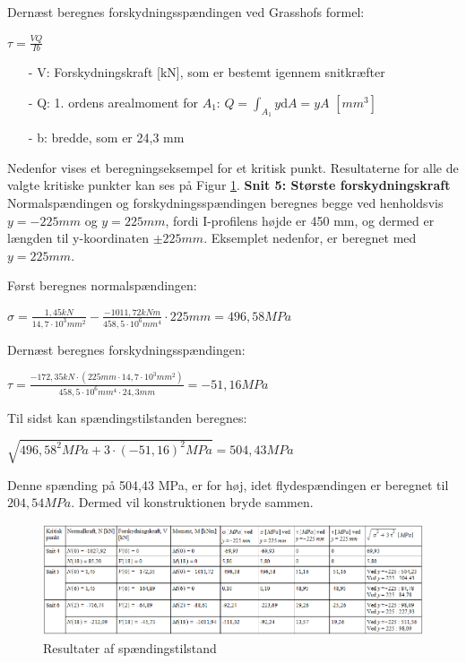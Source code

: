 Dernæst beregnes forskydningsspændingen ved Grasshofs formel:

\begin{center}
	$\tau = \frac{VQ}{Ib}$
\end{center}

\begin{itemize}
	\item[-] V: Forskydningskraft [kN], som er bestemt igennem snitkræfter
	\item[-] Q: 1. ordens arealmoment for $A_1$: $Q = \int_{A_1}y \mathrm{d}A = yA$ $[mm^3]$
	\item[-] b: bredde, som er 24,3 mm
\end{itemize}

Nedenfor vises et beregningseksempel for et kritisk punkt. Resultaterne for alle de valgte kritiske punkter kan ses på Figur \ref{fig:tabelspanding}. 
\newline
\newline
\textbf{Snit 5: Største forskydningskraft}
\newline
Normalspændingen og forskydningsspændingen beregnes begge ved henholdsvis $y = -225 mm$ og $y = 225 mm$, fordi I-profilens højde er 450 mm, og dermed er længden til y-koordinaten $\pm 225 mm$. Eksemplet nedenfor, er beregnet med $y = 225 mm$.

Først beregnes normalspændingen:
\begin{center}
	$\sigma = \frac{1,\!45 kN}{14,\!7 \cdot 10^3 mm^2} - \frac{-1011,\!72 kNm}{458,\!5 \cdot 10^6 mm^4} \cdot 225 mm = 496,\!58 MPa$
\end{center}

Dernæst beregnes forskydningsspændingen:
\begin{center}
	$\tau = \frac{-172,\!35 kN \cdot (225 mm \cdot 14,\!7\cdot10^3 mm^2)}{458,\!5\cdot10^6 mm^4 \cdot 24,\!3 mm} = -51,\!16 MPa$
\end{center}

Til sidst kan spændingstilstanden beregnes:
\begin{center}
	$\sqrt{496,\!58^2 MPa + 3 \cdot (-51,\!16)^2 MPa} = 504,\!43 MPa$
\end{center}

Denne spænding på 504,43 MPa, er for høj, idet flydespændingen er beregnet til $204,\!54 MPa$. Dermed vil konstruktionen bryde sammen.

 \begin{figure}[H]
 	\centering
 	\includegraphics[width=1.1\textwidth]{billeder/tabelspanding.png}
 	\caption{Resultater af spændingstilstand}
 	\label{fig:tabelspanding}
 \end{figure}

